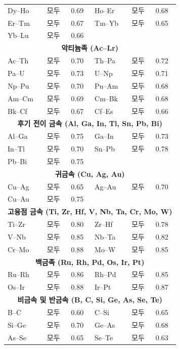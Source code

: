\documentclass[12pt,a4paper]{article}
\begin{document}
\begin{longtable}{p{2.5cm} p{2.5cm} p{1.2cm} p{2.5cm} p{2.5cm} p{1.2cm}}
		Dy–Ho & 모두 & 0.69 & Ho–Er & 모두 & 0.68 \\
		Er–Tm & 모두 & 0.67 & Tm–Yb & 모두 & 0.65 \\
		Yb–Lu & 모두 & 0.66 & & & \\
		\multicolumn{6}{c}{\textbf{악티늄족 (Ac–Lr)}} \\
		Ac–Th & 모두 & 0.70 & Th–Pa & 모두 & 0.72 \\
		Pa–U  & 모두 & 0.73 & U–Np & 모두 & 0.71 \\
		Np–Pu & 모두 & 0.70 & Pu–Am & 모두 & 0.68 \\
		Am–Cm & 모두 & 0.69 & Cm–Bk & 모두 & 0.68 \\
		Bk–Cf & 모두 & 0.67 & Cf–Es & 모두 & 0.66 \\
		\multicolumn{6}{c}{\textbf{후기 전이 금속 (Al, Ga, In, Tl, Sn, Pb, Bi)}} \\
		Al–Ga & 모두 & 0.75 & Ga–In & 모두 & 0.73 \\
		In–Tl & 모두 & 0.70 & Sn–Pb & 모두 & 0.78 \\
		Pb–Bi & 모두 & 0.75 & & & \\
		\multicolumn{6}{c}{\textbf{귀금속 (Cu, Ag, Au)}} \\
		Cu–Ag & 모두 & 0.65 & Ag–Au & 모두 & 0.70 \\
		Cu–Au & 모두 & 0.75 & & & \\
		\multicolumn{6}{c}{\textbf{고융점 금속 (Ti, Zr, Hf, V, Nb, Ta, Cr, Mo, W)}} \\
		Ti–Zr & 모두 & 0.80 & Zr–Hf & 모두 & 0.78 \\
		V–Nb & 모두 & 0.85 & Nb–Ta & 모두 & 0.82 \\
		Cr–Mo & 모두 & 0.88 & Mo–W & 모두 & 0.85 \\
		\multicolumn{6}{c}{\textbf{백금족 (Ru, Rh, Pd, Os, Ir, Pt)}} \\
		Ru–Rh & 모두 & 0.86 & Rh–Pd & 모두 & 0.85 \\
		Os–Ir & 모두 & 0.88 & Ir–Pt & 모두 & 0.87 \\
		\multicolumn{6}{c}{\textbf{비금속 및 반금속 (B, C, Si, Ge, As, Se, Te)}} \\
		B–C  & 모두 & 0.60 & C–Si  & 모두 & 0.65 \\
		Si–Ge & 모두 & 0.70 & Ge–As & 모두 & 0.68 \\
		As–Se & 모두 & 0.65 & Se–Te & 모두 & 0.63 \\
		\bottomrule
	\end{longtable}
	
\end{document}
